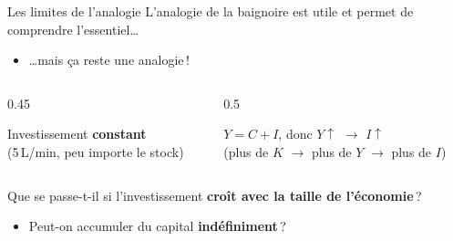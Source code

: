 \documentclass[aspectratio=169]{beamer}
\begin{document}
\begin{frame}[t]{Les limites de l'analogie}
   L'analogie de la baignoire est utile et permet de comprendre l'essentiel\ldots
   \vspace{0.15cm}
   \begin{itemize}
      \item \ldots mais ça reste une analogie\,!
   \end{itemize}
   \begin{columns}[T, totalwidth=\textwidth]
      \begin{column}{0.45\textwidth}
         \begin{tcolorbox}[colback=HEClightgray, colframe=HECgray, boxrule=0.5pt, arc=8pt, title=\textbf{Baignoire}, fonttitle=\small, colbacktitle=HECgray, coltitle=white, top=4pt, bottom=4pt]
            \small
            Investissement \textbf{constant} \\ (5\,L/min, peu importe le stock)
         \end{tcolorbox}
      \end{column}
      \begin{column}{0.5\textwidth}
         \begin{tcolorbox}[colback=HEClightgray, colframe=HECnavy, boxrule=0.5pt, arc=8pt, title=\textbf{Économie réelle}, fonttitle=\small, colbacktitle=HECnavy, coltitle=white, top=4pt, bottom=4pt]
            \small
            $Y = C + I$, donc $Y \uparrow$ $\to$ $I \uparrow$ \\ (plus de $K$ $\to$ plus de $Y$ $\to$ plus de $I$)
         \end{tcolorbox}
      \end{column}
   \end{columns}
   \vspace{0.75cm}
   Que se passe-t-il si l'investissement \textbf{croît avec la taille de l'économie}\,?
   \vspace{0.15cm}
   \begin{itemize}
      \item \textcolor{HECcoral}{Peut-on accumuler du capital \textbf{indéfiniment}\,?}
   \end{itemize}
\end{frame}
\end{document}
